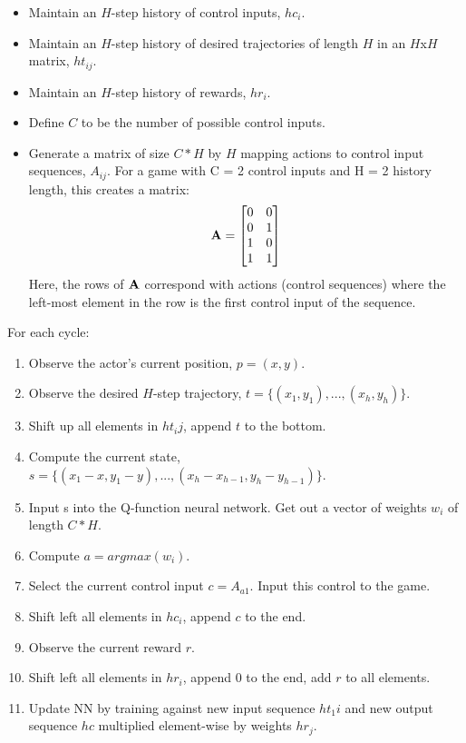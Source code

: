 \documentclass[11pt,english]{article}
\begin{document}
\begin{itemize}

\item Maintain an $H$-step history of control inputs, $hc_i$.
\item Maintain an $H$-step history of desired trajectories of length $H$ in an $H$x$H$ matrix, $ht_{ij}$.
\item Maintain an $H$-step history of rewards, $hr_i$.
\item Define $C$ to be the number of possible control inputs.
\item Generate a matrix of size $C*H$ by $H$ mapping actions to control input sequences, $A_{ij}$. For a game with C = 2 control inputs and H = 2 history length, this creates a matrix:
\[
\bf{A} = \begin{bmatrix} 0 & 0 \\
0 & 1 \\
1 & 0 \\
1 & 1 \end{bmatrix}
\]
Here, the rows of $\bf{A}$ correspond with actions (control sequences) where the left-most element in the row is the first control input of the sequence.

\end{itemize}

For each cycle:

\begin{enumerate}

\item Observe the actor's current position, $p = (x, y)$.
\item Observe the desired $H$-step trajectory, $t = \{(x_1, y_1), ..., (x_h, y_h)\}$.
\item Shift up all elements in $ht_ij$, append $t$ to the bottom.
\item Compute the current state, $s = \{(x_1 - x, y_1 - y), ..., (x_h - x_{h-1}, y_h - y_{h-1})\}$.
\item Input s into the Q-function neural network. Get out a vector of weights $w_i$ of length $C*H$.
\item Compute $a = argmax(w_i)$.
\item Select the current control input $c = A_{a1}$. Input this control to the game.
\item Shift left all elements in $hc_i$, append $c$ to the end.
\item Observe the current reward $r$.
\item Shift left all elements in $hr_i$, append $0$ to the end, add $r$ to all elements. 
\item Update NN by training against new input sequence $ht_1i$ and new output sequence $hc$ multiplied element-wise by weights $hr_j$.

\end{enumerate}
\end{document}
